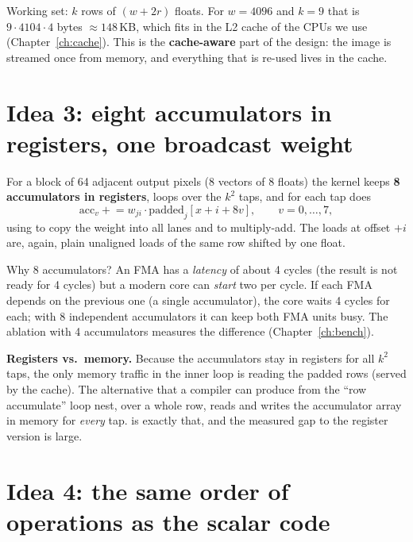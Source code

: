 Working set: $k$ rows of $(w+2r)$ floats. For $w=4096$ and $k=9$ that is $9\cdot4104\cdot4$ bytes $\approx 148$\,KB, which fits in the L2 cache of the CPUs we use (Chapter~\ref{ch:cache}). This is the \textbf{cache-aware} part of the design: the image is streamed once from memory, and everything that is re-used lives in the cache.

\section{Idea 3: eight accumulators in registers, one broadcast weight}

For a block of 64 adjacent output pixels (8 vectors of 8 floats) the kernel keeps \textbf{8 accumulators in registers}, loops over the $k^2$ taps, and for each tap does
\[
\text{acc}_v \mathrel{+}= w_{ji}\cdot \text{padded}_j[x+i+8v],\qquad v=0,\dots,7,
\]
using  to copy the weight into all lanes and  to multiply-add. The loads at offset $+i$ are, again, plain unaligned loads of the same row shifted by one float.

Why 8 accumulators? An FMA has a \emph{latency} of about 4 cycles (the result is not ready for 4 cycles) but a modern core can \emph{start} two per cycle. If each FMA depends on the previous one (a single accumulator), the core waits 4 cycles for each; with 8 independent accumulators it can keep both FMA units busy. The ablation with 4 accumulators measures the difference (Chapter~\ref{ch:bench}).

\begin{plain}
\textbf{Registers vs.\ memory.} Because the accumulators stay in registers for all $k^2$ taps, the only memory traffic in the inner loop is reading the padded rows (served by the cache). The alternative that a compiler can produce from the ``row accumulate'' loop nest,  over a whole row, reads and writes the accumulator array in memory for \emph{every} tap.  is exactly that, and the measured gap to the register version is large.
\end{plain}

\section{Idea 4: the same order of operations as the scalar code}

